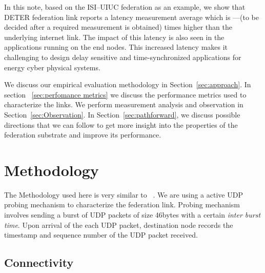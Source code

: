 \documentclass{sig-alternate-10pt} \usepackage{enumerate}
\begin{document}
In this note, based on the ISI--UIUC federation as an example, 
 we show that DETER federation link reports a latency measurement average
  which is ---(to be decided after a required measurement is obtained) times higher than the underlying internet link.
The impact of this latency is also seen in the applications
 running on the end nodes. 
 This increased latency makes it 
  challenging to 
  design
 delay sensitive and time-synchronized 
  applications for energy cyber physical systems. 

We discuss our empirical evaluation 
 methodology in Section~\ref{sec:approach}. In section ~\ref{sec:perfomance metrics} we discuss the performance metrics 
 used to characterize the links. We
perform measurement analysis and observation in Section~\ref{sec:Observation}.
In Section~\ref{sec:pathforward}, we discuss possible directions that we
can follow to get more insight into the properties of the federation substrate and
improve its performance.

\section{Methodology} 

  The Methodology used here is very similar to  ~\cite{wang06}.
  We are using a active UDP probing mechanism to characterize the federation link.
Probing mechanism involves sending a burst of UDP packets of size 46bytes with a certain {\it inter burst time}. Upon arrival of the each UDP packet, destination node records the timestamp and sequence number
of the UDP packet received. 

\label{sec:approach}

\subsection{Connectivity}
\end{document}
